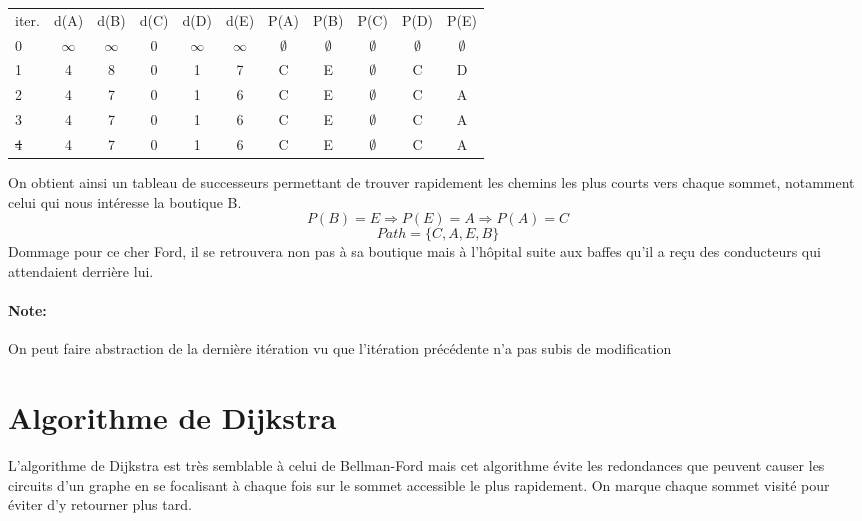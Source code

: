 \documentclass[11pt]{extarticle}
\begin{document}
\begin{center}
\begin{tabular*}{0.95\textwidth}{|l|c|c|c|c|c||c|c|c|c|c|}
 \rowcolor{light_green} iter. & d(A) & d(B) & d(C) & d(D) & d(E) & P(A)& P(B)& P(C)& P(D)& P(E) \\
  \rowcolor{light_green2} 0 & $\infty$ & $\infty$ & 0 & $\infty$ & $\infty$ & $\emptyset$ & $\emptyset$ & $\emptyset$ & $\emptyset$ & $\emptyset$ \\
   \rowcolor{light_green2} 1 & 4 & 8 & 0 & 1 & 7 & C & E & $\emptyset$ & C & D \\
   \rowcolor{light_green2} 2 & 4 & \cellcolor{blue} 7 & 0 & 1 & \cellcolor{blue} 6 & C & \cellcolor{blue} E & $\emptyset$ & C & \cellcolor{blue} A \\
   \rowcolor{light_green2} 3 & 4 & 7 & 0 & 1 & 6 & C & E & $\emptyset$ & C & A \\
   \rowcolor{light_gray} \sout{4} & 4 & 7 & 0 & 1 & 6 & C & E & $\emptyset$ & C & A \\
 \end{tabular*}
\end{center}

On obtient ainsi un tableau de successeurs permettant de trouver rapidement les chemins les plus courts vers chaque sommet, notamment celui qui nous intéresse la boutique B. 
\[P(B) = E \Rightarrow P(E) = A \Rightarrow P(A) = C\]
\[ Path = \{C, A, E, B\} \]
Dommage pour ce cher Ford, il se retrouvera non pas à sa boutique mais à l'hôpital suite aux baffes qu'il a reçu des conducteurs qui attendaient derrière lui.
\paragraph{\textbf{Note:}} On peut faire abstraction de la dernière itération vu que l'itération précédente n'a pas subis de modification
\section{Algorithme de Dijkstra}
L'algorithme de Dijkstra est très semblable à celui de Bellman-Ford mais cet algorithme évite les redondances que peuvent causer les circuits d'un graphe en se focalisant à chaque fois sur le sommet accessible le plus rapidement. On marque chaque sommet visité pour éviter d'y retourner plus tard.
\end{document}
